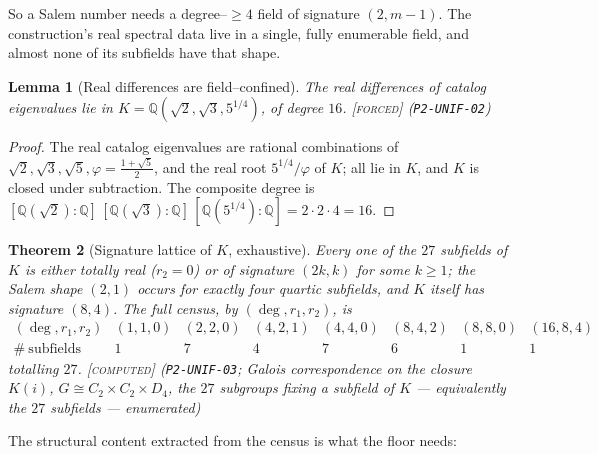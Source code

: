 \documentclass[11pt]{article}
\theoremstyle{plain}
\newtheorem{theorem}{Theorem}[section]
\newtheorem{lemma}[theorem]{Lemma}
\theoremstyle{definition}
\theoremstyle{remark}
\newcommand{\forced}{\textcolor{forcedc}{\textsc{[forced]}}}
\newcommand{\computed}{\textcolor{forcedc}{\textsc{[computed]}}}
\newcommand{\Q}{\mathbb{Q}}
\begin{document}
So a Salem number needs a degree--$\ge4$ field of signature $(2,m-1)$. The construction's real spectral data live in a single, fully enumerable field, and almost none of its subfields have that shape.

\begin{lemma}[Real differences are field--confined]\label{lem:diffconf}
The real differences of catalog eigenvalues lie in $K=\Q(\sqrt2,\sqrt3,5^{1/4})$, of degree $16$. \forced{} {\small(\texttt{P2-UNIF-02})}
\end{lemma}
\begin{proof}
The real catalog eigenvalues are rational combinations of $\sqrt2,\sqrt3,\sqrt5,\varphi=\tfrac{1+\sqrt5}2$, and the real root $5^{1/4}/\varphi$ of $K$; all lie in $K$, and $K$ is closed under subtraction. The composite degree is $[\Q(\sqrt2):\Q]\,[\Q(\sqrt3):\Q]\,[\Q(5^{1/4}):\Q]=2\cdot2\cdot4=16$.
\end{proof}

\begin{theorem}[Signature lattice of $K$, exhaustive]\label{thm:siglattice}
Every one of the $27$ subfields of $K$ is either totally real ($r_2=0$) or of signature $(2k,k)$ for some $k\ge1$; the Salem shape $(2,1)$ occurs for exactly four quartic subfields, and $K$ itself has signature $(8,4)$. The full census, by $(\deg,r_1,r_2)$, is
\[
\begin{array}{c|ccccccc}
(\deg,r_1,r_2) & (1,1,0) & (2,2,0) & (4,2,1) & (4,4,0) & (8,4,2) & (8,8,0) & (16,8,4)\\\hline
\#\ \text{subfields} & 1 & 7 & 4 & 7 & 6 & 1 & 1
\end{array}
\]
totalling $27$. \computed{} {\small(\texttt{P2-UNIF-03}; Galois correspondence on the closure $K(i)$, $G\cong C_2\times C_2\times D_4$, the $27$ subgroups fixing a subfield of $K$ --- equivalently the $27$ subfields --- enumerated)}
\end{theorem}

The structural content extracted from the census is what the floor needs:
\end{document}
